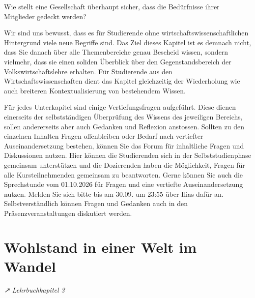 \documentclass[
  nswissgerman,
  a4paper,
  DIV=11,
  numbers=noendperiod,
  oneside,
  openany]{scrreprt}
\begin{document}
\begin{tcolorbox}[enhanced jigsaw, arc=.35mm, bottomrule=.15mm, bottomtitle=1mm, breakable, colback=white, colbacktitle=quarto-callout-note-color!10!white, colframe=quarto-callout-note-color-frame, coltitle=black, left=2mm, leftrule=.75mm, opacityback=0, opacitybacktitle=0.6, rightrule=.15mm, title={Übergeordnete Leitfrage dieses Kapitels}, titlerule=0mm, toprule=.15mm, toptitle=1mm]

Wie stellt eine Gesellschaft überhaupt sicher, dass die Bedürfnisse
ihrer Mitglieder gedeckt werden?

\end{tcolorbox}

Wir sind uns bewusst, dass es für Studierende ohne
wirtschaftswissenschaftlichen Hintergrund viele neue Begriffe sind. Das
Ziel dieses Kapitel ist es demnach nicht, dass Sie danach über alle
Themenbereiche genau Bescheid wissen, sondern vielmehr, dass sie einen
soliden Überblick über den Gegenstandsbereich der Volkswirtschaftslehre
erhalten. Für Studierende aus den Wirtschaftswissenschaften dient das
Kapitel gleichzeitig der Wiederholung wie auch breiteren
Kontextualisierung von bestehendem Wissen.

\begin{selbststudienphase}
Für jedes Unterkapitel sind einige Vertiefungsfragen aufgeführt. Diese dienen einerseits der selbstständigen Überprüfung des Wissens des jeweiligen Bereichs, sollen andererseits aber auch Gedanken und Reflexion anstossen. Sollten zu den einzelnen Inhalten Fragen offenbleiben oder Bedarf nach vertiefter Auseinandersetzung bestehen, können Sie das Forum für inhaltliche Fragen und Diskussionen nutzen. Hier können die Studierenden sich in der Selbststudienphase gemeinsam unterstützen und die Dozierenden haben die Möglichkeit, Fragen für alle Kursteilnehmenden gemeinsam zu beantworten. Gerne können Sie auch die Sprechstunde vom 01.10.2026 für Fragen und eine vertiefte Auseinandersetzung nutzen. Melden Sie sich bitte bis am 30.09. um 23:55 über Ilias dafür an. Selbstverständlich können Fragen und Gedanken auch in den Präsenzveranstaltungen diskutiert werden.
\end{selbststudienphase}

\section{Wohlstand in einer Welt im
Wandel}\label{wohlstand-in-einer-welt-im-wandel}

\emph{↗ Lehrbuchkapitel 3}
\end{document}
